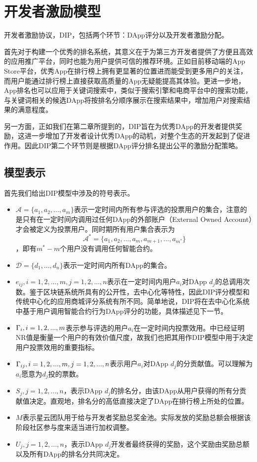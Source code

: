 \section{开发者激励模型}
开发者激励协议，DIP，包括两个环节：DApp评分以及开发者激励分配。

首先对于构建一个优秀的排名系统，其意义在于为第三方开发者提供了方便且高效的应用推广平台，同时也能为用户提供可信的推荐环境。正如目前移动端的App Store平台，优秀App在排行榜上拥有更显著的位置进而能受到更多用户的关注，而用户能通过排行榜上直接获取高质量的App无疑能提高其体验。更进一步地，App排名也可以应用于关键词搜索中，类似于搜索引擎和电商平台中的搜索功能，与关键词相关的候选DApp将按排名分顺序展示在搜索结果中，增加用户对搜索结果的满意程度。

另一方面，正如我们在第二章所提到的，DIP旨在为优秀DApp的开发者提供奖励，这进一步增加了开发者设计优秀DApp的动机，对整个生态的开发起到了促进作用。因此DIP第二个环节则是根据DApp评分排名提出公平的激励分配策略。

\subsection{模型表示}
\label{subsection:parameters}
首先我们给出DIP模型中涉及的符号表示。
\begin{itemize}
	\item $\mathcal{A}=\{a_1,a_2,...,a_m\}$表示一定时间内所有参与评选的投票用户的集合，注意的是只有在一定时间内调用过任何DApp的外部账户（External Owned Account）才会被定义为投票用户。同时期所有用户集合表示为$$\mathcal{A}^*=\{a_1,a_2,...,a_m,a_{m+1},...,a_{m^*}\}$$，即有$m^*-m$个用户没有调用任何智能合约。
	\item $\mathcal{D}=\{d_1,...,d_n\}$表示一定时间内所有DApp的集合。
	\item $e_{ij},i=1,2,...,m, j=1,2,...,n$表示在一定时间内用户$a_i$对DApp $d_j$的总调用次数。鉴于区块链系统所具有的公开性，去中心化等特性，因此DIP评分模型和传统中心化的应用商城评分系统有所不同。简单地说，DIP将在去中心化系统中基于用户调用智能合约行为DApp评分的功能，具体描述见下一节。
	\item $\Gamma_i, i=1,2,...,m$表示参与评选的用户$a_i$在一定时间内投票效用。\cite{Nebulasyellowpaper}中已经证明NR值是衡量一个用户的有效价值尺度，故我们也把其用作DIP模型中用于决定用户投票效用的重要指标。
	\item $\Gamma_{ij}, i=1,2,...,m,j=1,2,...,n$表示用户$a_i$对DApp $d_j$的分贡献值。可以理解为$a_i$愿意为$d_j$投的票数。%
	\item $S_j, j=1,2,...,n$，表示DApp $d_j$的排名分，由该DApp从用户获得的所有分贡献值决定。直观地，排名分的高低直接决定了DApp在排行榜上所处的位置。%
	\item $M$表示星云团队用于给与开发者奖励总奖金池。实际发放的奖励总额会根据该阶段社区参与度来适当进行加权调整。
	\item $U_j, j=1,2,...,n$，表示DApp $d_j$开发者最终获得的奖励，这个奖励由奖励总额以及所有DApp的排名分共同决定。%
\end{itemize}

